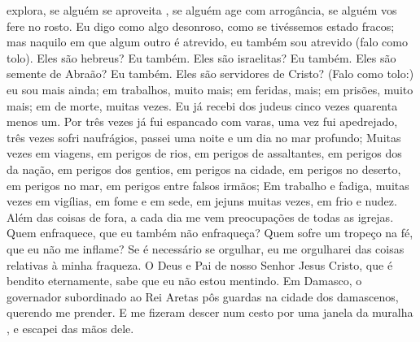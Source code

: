{{} explora, se alguém se aproveita
{},  se alguém age com arrogância, se alguém vos fere no rosto.
  Eu digo como algo desonroso, como se tivéssemos estado fracos; mas naquilo em que algum outro é atrevido, eu também sou atrevido (falo como tolo).
  Eles são hebreus? Eu também. Eles são israelitas? Eu também. Eles são semente de Abraão? Eu também.
  Eles são servidores de Cristo? (Falo como tolo:) eu sou mais ainda; em trabalhos, muito mais; em feridas, mais; em prisões, muito mais; em
{} de morte, muitas vezes.
  Eu já recebi dos judeus cinco vezes quarenta
{} menos um.
  Por três vezes já fui espancado com varas, uma vez fui apedrejado, três vezes sofri naufrágios, passei uma noite e um dia
{} no mar profundo;
  Muitas vezes em viagens, em perigos de rios, em perigos de assaltantes, em perigos dos da
{} nação, em perigos dos gentios, em perigos na cidade, em perigos no deserto, em perigos no mar, em perigos entre falsos irmãos;
  Em trabalho e fadiga, muitas vezes em vigílias, em fome e em sede, em jejuns muitas vezes, em frio e nudez.
  Além das coisas de fora, a cada dia me vem preocupações de todas as igrejas.
  Quem enfraquece, que eu também não enfraqueça? Quem sofre um tropeço na fé, que eu não me inflame?
  Se é necessário se orgulhar, eu me orgulharei das coisas relativas à minha fraqueza.
  O Deus e Pai de nosso Senhor Jesus Cristo, que é bendito eternamente, sabe que eu não estou mentindo.
  Em Damasco, o governador subordinado ao Rei Aretas pôs guardas na cidade dos damascenos, querendo me prender.
  E me fizeram descer num cesto por uma janela da muralha
{},  e
{} escapei das mãos dele.
\par }

